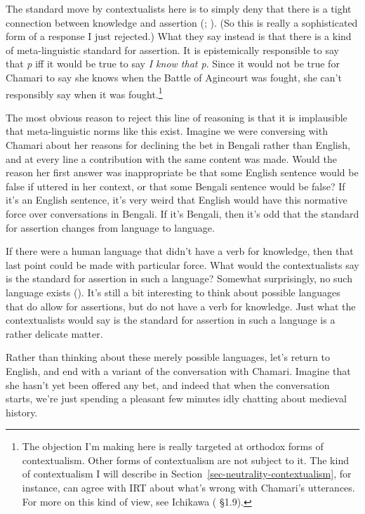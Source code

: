 \documentclass[
  10pt,
  letterpaper,
  twoside]{scrbook}
\begin{document}
The standard move by contextualists here is to simply deny that there is
a tight connection between knowledge and assertion
(;
). (So this is really a
sophisticated form of a response I just rejected.) What they say instead
is that there is a kind of meta-linguistic standard for assertion. It is
epistemically responsible to say that \emph{p} iff it would be true to
say \emph{I know that p}. Since it would not be true for Chamari to say
she knows when the Battle of Agincourt was fought, she can't responsibly
say when it was fought.\footnote{The objection I'm making here is really
  targeted at orthodox forms of contextualism. Other forms of
  contextualism are not subject to it. The kind of contextualism I will
  describe in Section~\ref{sec-neutrality-contextualism}, for instance,
  can agree with IRT about what's wrong with Chamari's utterances. For
  more on this kind of view, see Ichikawa
  ( §1.9).}

The most obvious reason to reject this line of reasoning is that it is
implausible that meta-linguistic norms like this exist. Imagine we were
conversing with Chamari about her reasons for declining the bet in
Bengali rather than English, and at every line a contribution with the
same content was made. Would the reason her first answer was
inappropriate be that some English sentence would be false if uttered in
her context, or that some Bengali sentence would be false? If it's an
English sentence, it's very weird that English would have this normative
force over conversations in Bengali. If it's Bengali, then it's odd that
the standard for assertion changes from language to language.

If there were a human language that didn't have a verb for knowledge,
then that last point could be made with particular force. What would the
contextualists say is the standard for assertion in such a language?
Somewhat surprisingly, no such language exists
(). It's still a bit interesting to
think about possible languages that do allow for assertions, but do not
have a verb for knowledge. Just what the contextualists would say is the
standard for assertion in such a language is a rather delicate matter.

Rather than thinking about these merely possible languages, let's return
to English, and end with a variant of the conversation with Chamari.
Imagine that she hasn't yet been offered any bet, and indeed that when
the conversation starts, we're just spending a pleasant few minutes idly
chatting about medieval history.
\end{document}

